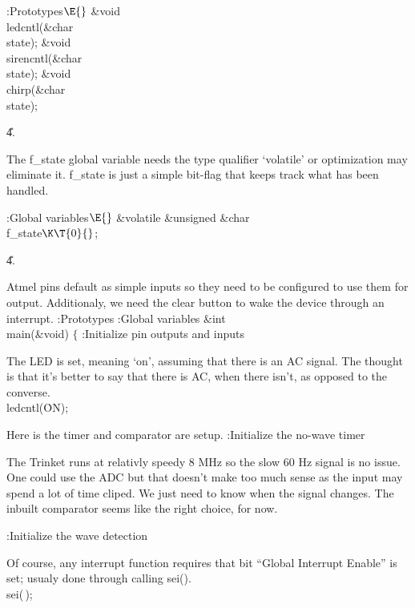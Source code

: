 \B{}:Prototypes\X${}\E{}$\6
\&{void} \\{ledcntl}(\&{char} \\{state});\6
\&{void} \\{sirencntl}(\&{char} \\{state});\6
\&{void} \\{chirp}(\&{char} \\{state});\par
\U4.\fi

The f\_state global variable needs the type qualifier `volatile' or
optimization may eliminate it.
f\_state is just a simple bit-flag that keeps track what has been handled.

\Y\B\4:Global variables\X${}\E{}$\6
\&{volatile} \&{unsigned} \&{char} \\{f\_state}${}\K\T{0}{}$;\par
\U4.\fi

Atmel pins default as simple inputs so they need to be configured to use them
for output.
Additionaly, we need the clear button to wake the device through an interrupt.
\Y\B{}:Prototypes\X\6
:Global variables\X\6
\&{int} \\{main}(\&{void})\1\1 $\{$ :Initialize pin outputs and inputs\X\par
\fi

The LED is set, meaning `on', assuming that there is an AC signal.
The thought is that it's better to say that there is AC, when there isn't, as
opposed to the converse.
\Y\B{}\6
\\{ledcntl}(\.{ON});\par
\fi

Here is the timer and comparator are setup.
\Y\B{}\6
:Initialize the no-wave timer\X\par
\fi

The Trinket runs at relativly speedy 8 MHz so the slow 60 Hz signal is no
issue.
One could use the ADC but that doesn't make too much sense as the input may
spend a lot of time cliped.
We just need to know when the signal changes.
The inbuilt comparator seems like the right choice, for now.

\Y\B{}\6
:Initialize the wave detection\X\par
\fi

Of course, any interrupt function requires that bit ``Global Interrupt Enable''
is set; usualy done through calling sei().
\Y\B{}\6
\\{sei}(\,);\par
\fi


